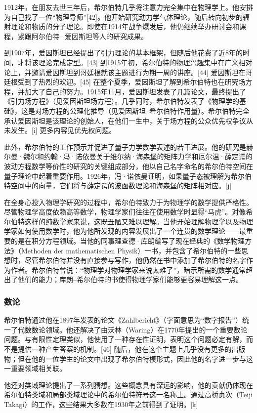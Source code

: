 1912年，在朋友去世三年后，希尔伯特几乎将注意力完全集中在物理学上。他安排为自己找了一位“物理导师”[42]。他开始研究动力学气体理论，随后转向初步的辐射理论和物质的分子理论。即使在1914年战争爆发后，他仍继续举办研讨会和课程，紧跟阿尔伯特·爱因斯坦等人的研究成果。

到1907年，爱因斯坦已经提出了引力理论的基本框架，但随后他花费了近8年的时间，才将该理论完成定型。[43] 到1915年初，希尔伯特的物理兴趣集中在广义相对论上，并邀请爱因斯坦到哥廷根就该主题进行为期一周的讲座。[44] 爱因斯坦在哥廷根受到了热烈的欢迎。[45] 在整个夏季，爱因斯坦了解到希尔伯特也在研究场方程，并加大了自己的努力。1915年11月，爱因斯坦发表了几篇论文，最终提出了《引力场方程》（见爱因斯坦场方程）。几乎同时，希尔伯特发表了《物理学的基础》，这是对场方程的公理化推导（见爱因斯坦–希尔伯特作用量）。希尔伯特完全承认爱因斯坦是该理论的创始人，在他们一生中，关于场方程的公众优先权争议从未发生。[i] 更多内容见优先权问题。

此外，希尔伯特的工作预示并促进了量子力学数学表述的若干进展。他的研究是赫尔曼·魏尔和约翰·冯·诺依曼关于维尔纳·海森堡的矩阵力学和厄尔温·薛定谔的波动方程数学等价性的研究的关键组成部分，他以自己名字命名的希尔伯特空间在量子理论中起着重要作用。1926年，冯·诺依曼证明，如果量子态被理解为希尔伯特空间中的向量，它们将与薛定谔的波函数理论和海森堡的矩阵相对应。[j]

在全身心投入物理学研究的过程中，希尔伯特致力于为物理学的数学提供严格性。尽管物理学高度依赖高等数学，物理学家们往往在使用数学时显得“马虎”。对像希尔伯特这样的纯数学家来说，这既丑陋又难以理解。当他开始理解物理学以及物理学家如何使用数学时，他为他所发现的内容发展出了一个连贯的数学理论——最重要的是在积分方程领域。当他的同事理查德·库朗编写了现在经典的《数学物理方法》（Methoden der mathematischen Physik）一书，并包含了希尔伯特的一些思想时，尽管希尔伯特并没有直接参与写作，他仍然在书中添加了希尔伯特的名字作为作者。希尔伯特曾说：“物理学对物理学家来说太难了”，暗示所需的数学通常超出了他们的能力；库朗–希尔伯特的书使得物理学家们能够更容易理解这一点。
\subsubsection{数论}
希尔伯特通过他在1897年发表的论文《Zahlbericht》（字面意思为“数字报告”）统一了代数数论领域。他还解决了由沃林（Waring）在1770年提出的一个重要数论问题。与有限性定理类似，他使用了一种存在性证明，表明这个问题必定有解，而不是提供一种产生答案的机制。[46] 随后，他在这个主题上几乎没有更多的出版物；但在他的一位学生的论文中出现了希尔伯特模形式，因此他的名字进一步与这一重要领域相关联。

他还对类域理论提出了一系列猜想。这些概念具有深远的影响，他的贡献仍体现在希尔伯特类域和局部类域理论中的希尔伯特符号这一名称上。通过高桥贞次（Teiji Takagi）的工作，这些结果大多数在1930年之前得到了证明。[k]


